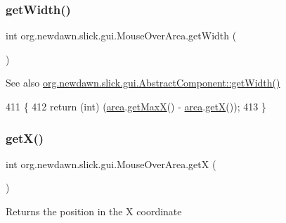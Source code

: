 \subsubsection{\texorpdfstring{get\+Width()}{getWidth()}}
{\footnotesize\ttfamily int org.\+newdawn.\+slick.\+gui.\+Mouse\+Over\+Area.\+get\+Width (\begin{DoxyParamCaption}{ }\end{DoxyParamCaption})\hspace{0.3cm}{\ttfamily [inline]}}

\begin{DoxySeeAlso}{See also}
\mbox{\hyperlink{classorg_1_1newdawn_1_1slick_1_1gui_1_1_abstract_component_ab09e022b383b64e6b82dd03525a7efc9}{org.\+newdawn.\+slick.\+gui.\+Abstract\+Component\+::get\+Width()}} 
\end{DoxySeeAlso}

\begin{DoxyCode}
411                           \{
412         \textcolor{keywordflow}{return} (\textcolor{keywordtype}{int}) (\mbox{\hyperlink{classorg_1_1newdawn_1_1slick_1_1gui_1_1_mouse_over_area_a8104ad89fbe457da294da3285b7a3268}{area}}.\mbox{\hyperlink{classorg_1_1newdawn_1_1slick_1_1geom_1_1_shape_ac3770421955c18dbf97dbaac012e0727}{getMaxX}}() - \mbox{\hyperlink{classorg_1_1newdawn_1_1slick_1_1gui_1_1_mouse_over_area_a8104ad89fbe457da294da3285b7a3268}{area}}.\mbox{\hyperlink{classorg_1_1newdawn_1_1slick_1_1geom_1_1_shape_a736a47bfdd6f164558b43fd497a3a3f3}{getX}}());
413     \}
\end{DoxyCode}
\mbox{\label{classorg_1_1newdawn_1_1slick_1_1gui_1_1_mouse_over_area_a2856fed67e12db6016846dca42316ddd}} 
\subsubsection{\texorpdfstring{get\+X()}{getX()}}
{\footnotesize\ttfamily int org.\+newdawn.\+slick.\+gui.\+Mouse\+Over\+Area.\+getX (\begin{DoxyParamCaption}{ }\end{DoxyParamCaption})\hspace{0.3cm}{\ttfamily [inline]}}

Returns the position in the X coordinate

